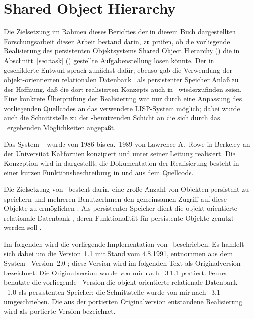 %
\chapter{Shared Object Hierarchy}%
\label{chap:soh}%
%
Die Zielsetzung im Rahmen \ifbericht dieses Berichtes \else\ifbuch der
in diesem Buch dargestellten Forschungsarbeit \else dieser Arbeit
\fi\fi bestand darin, zu pr\"{u}fen, ob die vorliegende Realisierung
des persistenten Objektsystems Shared Object Hierarchy (\soh) die in
Abschnitt~\ref{sec:task} (\citepage{\pageref{sec:task}}) gestellte
Aufgabenstellung l\"{o}sen k\"{o}nnte. Der in \cite{bib:ro87}
geschilderte Entwurf sprach zun\"{a}chst daf\"{u}r; ebenso gab die
Verwendung der objekt-orientierten relationalen Datenbank \postgres\ 
als persistenter Speicher Anla\ss{} zu der Hoffnung, da\ss{} die dort
realisierten Konzepte auch in \soh\ wiederzufinden seien. Eine
konkrete \"{U}berpr\"{u}fung der Realisierung war nur durch eine
Anpassung des vorliegenden Quellcodes an das verwendete LISP-System
m\"{o}glich; dabei wurde auch die Schnittstelle zu der
\soh-benutzenden Schicht an die sich durch das \mop\ ergebenden
M\"{o}g\-lich\-kei\-ten angepa\ss{}t.
%
\par{}Das System \soh\ \cite{bib:ro87} wurde von 1986 bis ca.\ 1989
von Lawrence A.\ Rowe in Berkeley an der Universit\"{a}t Kalifornien
konzipiert und unter seiner Leitung realisiert. Die Konzeption wird in
\cite{bib:ro87} dargestellt; die Dokumentation der Realisierung
besteht in einer kurzen Funktionsbeschreibung in \cite[\citepage{5-74
-- 5-79}]{bib:scha90} und aus dem Quellcode.
%
\par{}Die Zielsetzung von \soh\ besteht darin, eine gro\ss{}e Anzahl von
Objekten persistent zu speichern und mehreren BenutzerInnen den
gemeinsamen Zugriff auf diese
Objekte zu erm\"{o}glichen \cite[]{bib:ro87}. Als
persistenter Speicher dient die objekt-orientierte relationale
Datenbank \postgres, deren Funktionalit\"{a}t f\"{u}r persistente Objekte
genutzt werden soll \cite[\citepage{2}]{bib:ro87}.
%
\par{}Im folgenden wird die vorliegende Implementation von
\soh\ beschrieben.  Es handelt sich dabei um die Version~1.1 mit Stand
vom 4.8.1991, entnommen aus dem System \picasso\ Version~2.0
\cite{bib:scha90}; diese Version wird im folgenden Text als
Originalversion bezeichnet. Die Originalversion wurde von mir nach
\lwcl~3.1.1 portiert. Ferner benutzte die vorliegende \soh\ Version
die objekt-orientierte relationale Datenbank \postgres~1.0 als
persistenten Speicher; die Schnittstelle wurde von mir nach
\postgres~3.1 umgeschrieben. Die aus der portierten Originalversion
entstandene Realisierung wird als portierte Version bezeichnet.
%
